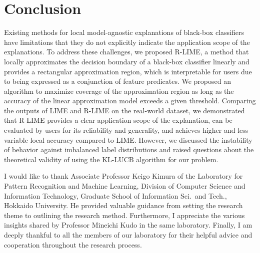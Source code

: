 \documentclass[11pt]{article}
\begin{document}
\section{Conclusion}
Existing methods for
local model-agnostic explanations of black-box classifiers have limitations
that they do not explicitly indicate the application scope of the explanations.
To address these challenges,
we proposed R-LIME, a method that locally approximates the decision boundary
of a black-box classifier linearly and provides a rectangular approximation region,
which is interpretable for users due to being expressed as a conjunction of feature predicates.
We proposed an algorithm to
maximize coverage of the approximation region
as long as the accuracy of the linear approximation model exceeds a given threshold.
Comparing the outputs of LIME and R-LIME on the real-world dataset,
we demonstrated that R-LIME provides a clear application scope of the
explanation, can be evaluated by users for its reliability and generality,
and achieves higher and less variable local accuracy compared to LIME\@.
However, we discussed the instability of behavior against imbalanced label
distributions and raised questions about the theoretical validity of using
the KL-LUCB algorithm for our problem.

\ifnum{}
  \acknowledge
  I would like to thank Associate Professor Keigo Kimura
  of the Laboratory for Pattern Recognition and Machine Learning,
  Division of Computer Science and Information Technology,
  Graduate School of Information Sci.\ and Tech., Hokkaido University.
  He provided valuable guidance
  from setting the research theme to outlining the research method.
  Furthermore,
  I appreciate the various insights shared by Professor Mineichi Kudo
  in the same laboratory.
  Finally, I am deeply thankful to all the members of our laboratory
  for their helpful advice and cooperation throughout the research process.
\fi

\ifnum{}
  
\else
  
\fi

\end{document}
